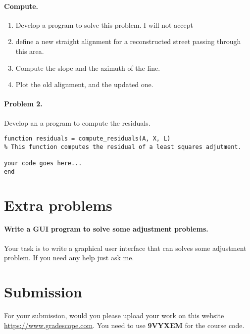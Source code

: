 \documentclass[]{scrartcl}
\begin{document}
\paragraph{Compute.}
\begin{enumerate}
	\item Develop a program to solve this problem. I will not accept 
	\item define a new straight alignment for a reconstructed street passing through this area.
	\item Compute the slope and the azimuth of the line.
	\item Plot the old alignment, and the updated one.
\end{enumerate}


\paragraph{Problem 2.}
Develop an a program to compute the residuals.

\begin{verbatim}
function residuals = compute_residuals(A, X, L)
% This function computes the residual of a least squares adjutment.

your code goes here...
end
\end{verbatim}

\section{Extra problems}
\paragraph{Write a GUI program to solve some adjustment problems.}Your task is to write a graphical user interface that can solves some adjustment problem. If you need any help just ask me.
\section{Submission}
For your submission, would you please upload your work on this website \href{https://www.gradescope.com}{https://www.gradescope.com}. You need to use \textbf{9VYXEM} for the course code.
\end{document}
